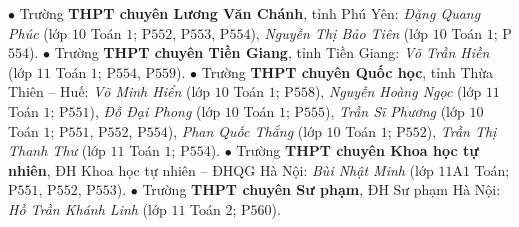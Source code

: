 \begin{multicols}{2}
	\vskip 0.05cm
	$\bullet$ Trường \textbf{\color{thachthuctoanhoc}THPT chuyên Lương Văn \linebreak Chánh}, tỉnh Phú Yên: \textit{Đặng Quang Phúc} (lớp $10$ Toán $1$; P$552$, P$553$, P$554$), \textit{Nguyễn Thị Bảo Tiên} (lớp $10$ Toán $1$; P$554$).
	\vskip 0.05cm
	$\bullet$ Trường \textbf{\color{thachthuctoanhoc}THPT chuyên Tiền Giang}, tỉnh Tiền Giang: \textit{Võ Trần Hiền} (lớp $11$ Toán $1$; P$554$, P$559$).
	\vskip 0.05cm
	$\bullet$ Trường \textbf{\color{thachthuctoanhoc}THPT chuyên Quốc học}, tỉnh Thừa Thiên -- Huế: \textit{Võ Minh Hiển} (lớp $10$ Toán $1$; P$558$), \textit{Nguyễn Hoàng Ngọc} (lớp $11$ Toán $1$; P$551$), \textit{Đỗ Đại Phong} (lớp $10$ Toán $1$; P$555$), \textit{Trần Sĩ Phương} (lớp $10$ Toán $1$; P$551$, P$552$, P$554$), \textit{Phan Quốc Thắng} (lớp $10$ Toán $1$; P$552$), \textit{Trần Thị Thanh Thư} (lớp $11$ Toán $1$; P$554$).
	\vskip 0.05cm
	$\bullet$ Trường \textbf{\color{thachthuctoanhoc}THPT chuyên Khoa học tự nhiên}, ĐH Khoa học tự nhiên -- ĐHQG Hà Nội: \textit{Bùi Nhật Minh} (lớp $11$A$1$ Toán; P$551$, P$552$, P$553$).
	\vskip 0.05cm
	$\bullet$ Trường \textbf{\color{thachthuctoanhoc}THPT chuyên Sư phạm}, ĐH Sư phạm Hà Nội: \textit{Hồ Trần Khánh Linh} (lớp $11$ Toán $2$; P$560$).
\end{multicols}

